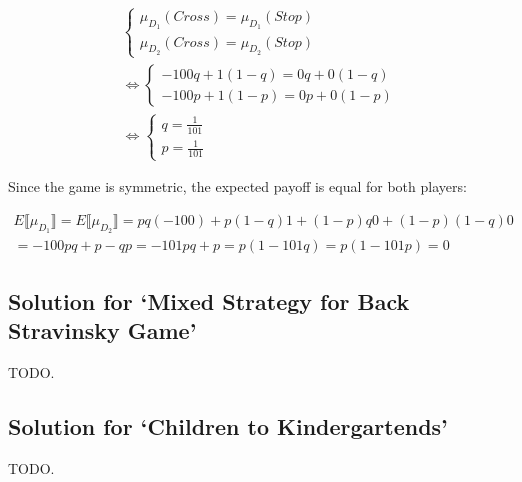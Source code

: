 \documentclass{article}
\begin{document}
\begin{align}
    \begin{cases}
        \mu_{D_1}(\textit{Cross})  = \mu_{D_1}(\textit{Stop}) \\
        \mu_{D_2}(\textit{Cross})  = \mu_{D_2}(\textit{Stop})
    \end{cases} \\
    \iff
    \begin{cases}
        -100q + 1(1 - q) = 0 q + 0(1 - q) \\
        -100p + 1(1 - p) = 0 p + 0(1 - p)
    \end{cases} \\
    \iff
    \begin{cases}
        q = \frac{1}{101} \\
        p = \frac{1}{101}
    \end{cases}
\end{align}

\noindent Since the game is symmetric, the expected payoff is equal for both players:

\begin{align*}
    E \llbracket \mu_{D_1} \rrbracket = E \llbracket \mu_{D_2} \rrbracket = pq(-100) + p(1- q)1 + (1- p)q0 + (1 - p)(1 - q)0 \\
    = -100pq + p - qp = -101pq + p = p (1 - 101q) = p(1 - 101p) = 0
\end{align*}

\subsection{Solution for `Mixed Strategy for Back Stravinsky Game'}

TODO.

\subsection{Solution for `Children to Kindergartends'}

TODO.
\end{document}
